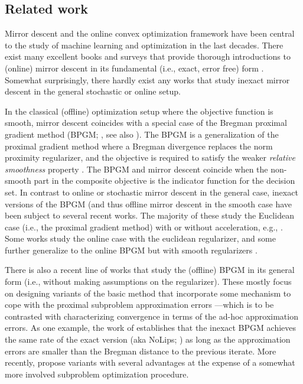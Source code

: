 \documentclass[10pt]{article}
\let\cite\citep
\theoremstyle{definition}
\theoremstyle{remark}
\begin{document}
\subsection{Related work}\label{sec:related work}

Mirror descent \cite{nemirovskij1983problem, beck2003mirror} and the online convex optimization framework \citep{zinkevich2003online} have been central to the study of machine learning and optimization in the last decades.
There exist many excellent books and surveys that provide thorough introductions to (online) mirror descent in its fundamental (i.e., exact, error free) form \citep{shalev2012online, bubeck2015convex, hazan2016introduction, beck2017first}. Somewhat surprisingly, there hardly exist any works that study inexact mirror descent in the general stochastic or online setup.


In the classical (offline) optimization setup where the objective function is smooth, mirror descent coincides with a special case of the Bregman proximal gradient method (BPGM; \cite{bauschke2017descent, lu2018relatively}, see also \cite{teboulle2018simplified}).
The BPGM is a generalization of the proximal gradient method \citep{rockafellar1976monotone} where a Bregman divergence replaces the norm proximity regularizer, and the objective is required to satisfy the weaker \emph{relative smoothness} property \citep{bauschke2017descent}.
The BPGM and mirror descent coincide when the non-smooth part in the composite objective is the indicator function for the decision set.
In contrast to online or stochastic mirror descent in the general case, inexact versions of the BPGM (and thus offline mirror descent in the smooth case have been subject to several recent works. 
The majority of these study the Euclidean case (i.e., the proximal gradient method) with or without acceleration, e.g., \cite{schmidt2011convergence, villa2013accelerated, zhou2022acceleration, ahookhosh2024high}.
Some works study the online case 
\cite{dixit2019online} with the euclidean regularizer, and some further generalize to the online BPGM but with smooth regularizers \citep{choi2023inexact}.


There is also a recent line of works that study the (offline) BPGM in its general form (i.e., without making assumptions on the regularizer). These mostly focus on designing variants of the basic method that incorporate some mechanism to cope with the proximal subproblem approximation errors \citep{rebegoldi2018bregman, kabbadj2020inexact, stonyakin2021inexact, yang2025inexact}---which is to be contrasted with characterizing convergence in terms of the ad-hoc approximation errors.
As one example, the work of \citet{kabbadj2020inexact} establishes that the inexact BPGM achieves the same rate of the exact version (aka NoLips; \citealp{bauschke2017descent}) as long as the approximation errors are smaller than the Bregman distance to the previous iterate.
More recently, \citet{yang2025inexact} propose variants with several advantages at the expense of a somewhat more involved subproblem optimization procedure.
\end{document}
